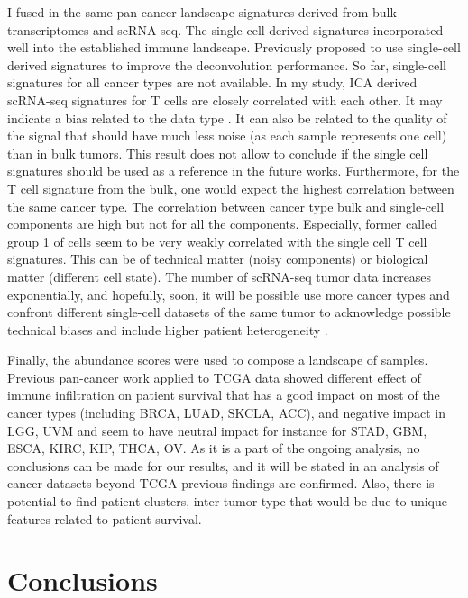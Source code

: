 \documentclass[12pt,]{book}
\theoremstyle{definition}
\theoremstyle{definition}
\theoremstyle{definition}
\theoremstyle{remark}
\begin{document}
I fused in the same pan-cancer landscape signatures derived from bulk
transcriptomes and scRNA-seq. The single-cell derived signatures
incorporated well into the established immune landscape. Previously
\citep{Schelker2017, Racle2017, Gortler2018} proposed to use single-cell
derived signatures to improve the deconvolution performance. So far,
single-cell signatures for all cancer types are not available. In my
study, ICA derived scRNA-seq signatures for T cells are closely
correlated with each other. It may indicate a bias related to the data
type \citep{Kharchenko2014}. It can also be related to the quality of
the signal that should have much less noise (as each sample represents
one cell) than in bulk tumors. This result does not allow to conclude if
the single cell signatures should be used as a reference in the future
works. Furthermore, for the T cell signature from the bulk, one would
expect the highest correlation between the same cancer type. The
correlation between cancer type bulk and single-cell components are high
but not for all the components. Especially, former called group 1 of
cells seem to be very weakly correlated with the single cell T cell
signatures. This can be of technical matter (noisy components) or
biological matter (different cell state). The number of scRNA-seq tumor
data increases exponentially, and hopefully, soon, it will be possible
use more cancer types and confront different single-cell datasets of the
same tumor to acknowledge possible technical biases and include higher
patient heterogeneity \citep{Svensson2018b}.

Finally, the abundance scores were used to compose a landscape of
samples. Previous pan-cancer work \citep[Fig 1D]{Tamborero2018} applied
to TCGA data showed different effect of immune infiltration on patient
survival that has a good impact on most of the cancer types (including
BRCA, LUAD, SKCLA, ACC), and negative impact in LGG, UVM and seem to
have neutral impact for instance for STAD, GBM, ESCA, KIRC, KIP, THCA,
OV. As it is a part of the ongoing analysis, no conclusions can be made
for our results, and it will be stated in an analysis of cancer datasets
beyond TCGA previous findings are confirmed. Also, there is potential to
find patient clusters, inter tumor type that would be due to unique
features related to patient survival.

\hypertarget{resconcl}{%
\section{Conclusions}\label{resconcl}}
\end{document}
